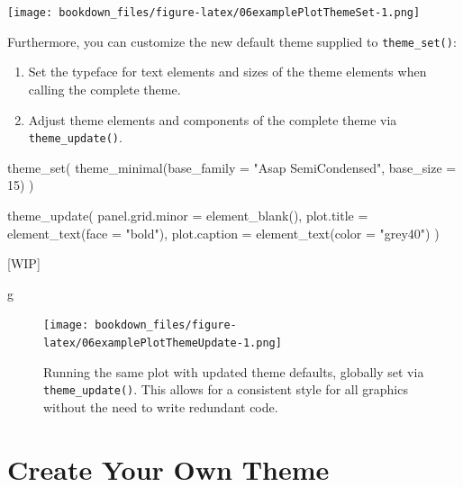 \documentclass[
]{krantz}
\makeatletter
\newenvironment{Shaded}{\begin{snugshade}}{\end{snugshade}}
\newcommand{\AttributeTok}[1]{\textcolor[rgb]{0.61,0.61,0.61}{#1}}
\newcommand{\DecValTok}[1]{\textcolor[rgb]{0.06,0.06,0.06}{#1}}
\newcommand{\FunctionTok}[1]{\textcolor[rgb]{0,0,0}{#1}}
\newcommand{\NormalTok}[1]{#1}
\newcommand{\StringTok}[1]{\textcolor[rgb]{0.5,0.5,0.5}{#1}}
\providecommand{\tightlist}{%
  \setlength{\itemsep}{0pt}\setlength{\parskip}{0pt}}
\newenvironment{kframe}{%
\medskip{}
\setlength{\fboxsep}{.8em}
 \def\at@end@of@kframe{}%
 \ifinner\ifhmode%
  \def\at@end@of@kframe{\end{minipage}}%
  \begin{minipage}{\columnwidth}%
 \fi\fi%
 \def\FrameCommand##1{\hskip\@totalleftmargin \hskip-\fboxsep
 \colorbox{shadecolor}{##1}\hskip-\fboxsep
     \hskip-\linewidth \hskip-\@totalleftmargin \hskip\columnwidth}%
 \MakeFramed {\advance\hsize-\width
   \@totalleftmargin\z@ \linewidth\hsize
   \@setminipage}}%
 {\par\unskip\endMakeFramed%
 \at@end@of@kframe}
\renewenvironment{Shaded}{\begin{kframe}}{\end{kframe}}
\makeatother
\begin{document}
\texttt{[image: bookdown\_files/figure-latex/06examplePlotThemeSet-1.png]}

Furthermore, you can customize the new default theme supplied to \texttt{theme\_set()}:

\begin{enumerate}
\def\labelenumi{\arabic{enumi}.}
\tightlist
\item
  Set the typeface for text elements and sizes of the theme elements when calling the complete theme.
\item
  Adjust theme elements and components of the complete theme via \texttt{theme\_update()}.
\end{enumerate}

\begin{Shaded}
\begin{Highlighting}[]
\FunctionTok{theme\_set}\NormalTok{(}
  \FunctionTok{theme\_minimal}\NormalTok{(}\AttributeTok{base\_family =} \StringTok{"Asap SemiCondensed"}\NormalTok{, }\AttributeTok{base\_size =} \DecValTok{15}\NormalTok{)}
\NormalTok{)}

\FunctionTok{theme\_update}\NormalTok{(}
  \AttributeTok{panel.grid.minor =} \FunctionTok{element\_blank}\NormalTok{(),}
  \AttributeTok{plot.title =} \FunctionTok{element\_text}\NormalTok{(}\AttributeTok{face =} \StringTok{"bold"}\NormalTok{),}
  \AttributeTok{plot.caption =} \FunctionTok{element\_text}\NormalTok{(}\AttributeTok{color =} \StringTok{"grey40"}\NormalTok{)}
\NormalTok{)}
\end{Highlighting}
\end{Shaded}

{[}WIP{]}

\begin{Shaded}
\begin{Highlighting}[]
\NormalTok{g}
\end{Highlighting}
\end{Shaded}

\begin{figure}
\centering
\texttt{[image: bookdown\_files/figure-latex/06examplePlotThemeUpdate-1.png]}
\caption{\label{fig:06examplePlotThemeUpdate}Running the same plot with updated theme defaults, globally set via \texttt{theme\_update()}. This allows for a consistent style for all graphics without the need to write redundant code.}
\end{figure}

\hypertarget{create-your-own-theme}{%
\section{Create Your Own Theme}\label{create-your-own-theme}}
\end{document}
